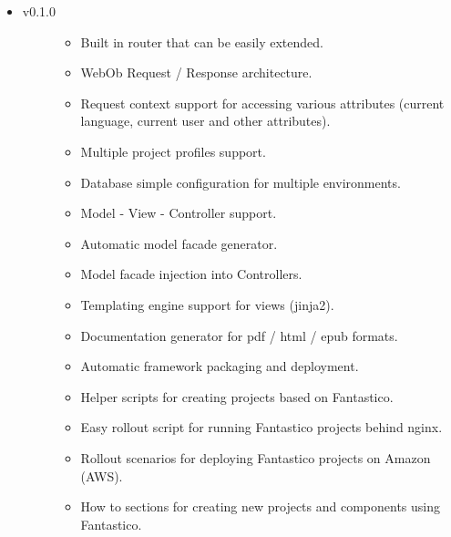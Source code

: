 \documentclass[letterpaper,10pt,english]{sphinxmanual}
\begin{document}
\begin{itemize}
\begin{description}
\begin{itemize}
\end{itemize}

\end{description}

\item {} \begin{description}
\item[{v0.1.0}] \leavevmode\begin{itemize}
\item {} 
Built in router that can be easily extended.

\item {} 
WebOb Request / Response architecture.

\item {} 
Request context support for accessing various attributes (current language, current user and other attributes).

\item {} 
Multiple project profiles support.

\item {} 
Database simple configuration for multiple environments.

\item {} 
Model - View - Controller support.

\item {} 
Automatic model facade generator.

\item {} 
Model facade injection into Controllers.

\item {} 
Templating engine support for views (jinja2).

\item {} 
Documentation generator for pdf / html / epub formats.

\item {} 
Automatic framework packaging and deployment.

\item {} 
Helper scripts for creating projects based on Fantastico.

\item {} 
Easy rollout script for running Fantastico projects behind nginx.

\item {} 
Rollout scenarios for deploying Fantastico projects on Amazon (AWS).

\item {} 
How to sections for creating new projects and components using Fantastico.

\end{itemize}

\end{description}

\end{itemize}
\end{document}
